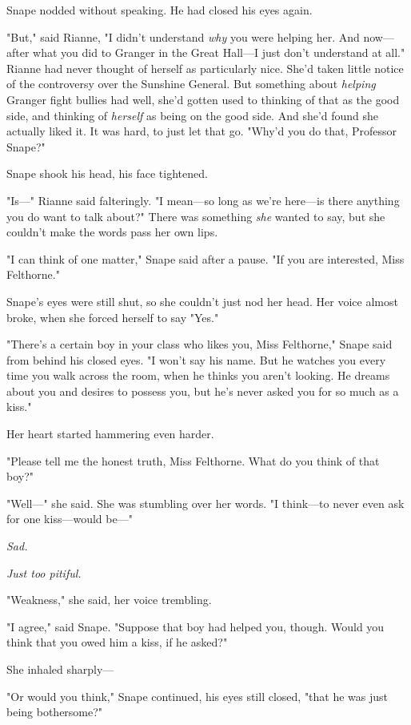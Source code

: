 Snape nodded without speaking. He had closed his eyes again.

"But," said Rianne, "I didn't understand \emph{why} you were helping her. And
now—after what you did to Granger in the Great Hall—I just don't understand
at all." Rianne had never thought of herself as particularly nice. She'd taken
little notice of the controversy over the Sunshine General. But something about
\emph{helping} Granger fight bullies had{\el} well, she'd gotten used to
thinking of that as the good side, and thinking of \emph{herself} as being on
the good side. And she'd found she actually liked it. It was hard, to just let
that go. "Why'd you do that, Professor Snape?"

Snape shook his head, his face tightened.

"Is—" Rianne said falteringly. "I mean—so long as we're here—is there
anything you do want to talk about?" There was something \emph{she} wanted to
say, but she couldn't make the words pass her own lips.

"I can think of one matter," Snape said after a pause. "If you are interested,
Miss Felthorne."

Snape's eyes were still shut, so she couldn't just nod her head. Her voice
almost broke, when she forced herself to say "Yes."

"There's a certain boy in your class who likes you, Miss Felthorne," Snape said
from behind his closed eyes. "I won't say his name. But he watches you every
time you walk across the room, when he thinks you aren't looking. He dreams
about you and desires to possess you, but he's never asked you for so much as a
kiss."

Her heart started hammering even harder.

"Please tell me the honest truth, Miss Felthorne. What do you think of that
boy?"

"Well—" she said. She was stumbling over her words. "I think—to never even
ask for one kiss—would be—"

\emph{Sad.}

\emph{Just too pitiful.}

"Weakness," she said, her voice trembling.

"I agree," said Snape. "Suppose that boy had helped you, though. Would you
think that you owed him a kiss, if he asked?"

She inhaled sharply—

"Or would you think," Snape continued, his eyes still closed, "that he was just
being bothersome?"

